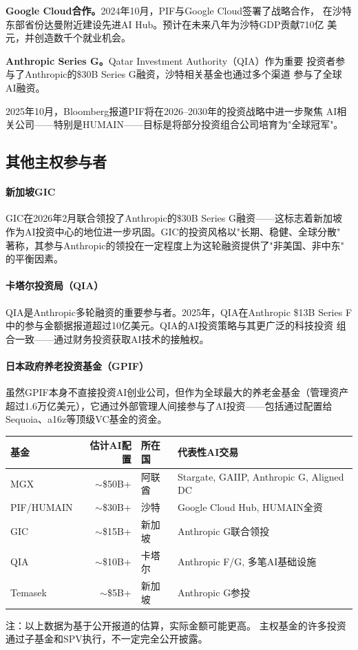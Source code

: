 \textbf{Google Cloud合作。}2024年10月，PIF与Google Cloud签署了战略合作，
在沙特东部省份达曼附近建设先进AI Hub。预计在未来八年为沙特GDP贡献710亿
美元，并创造数千个就业机会。

\textbf{Anthropic Series G。}Qatar Investment Authority（QIA）作为重要
投资者参与了Anthropic的\$30B Series G融资，沙特相关基金也通过多个渠道
参与了全球AI融资。

2025年10月，Bloomberg报道PIF将在2026--2030年的投资战略中进一步聚焦
AI相关公司——特别是HUMAIN——目标是将部分投资组合公司培育为"全球冠军"。


\subsection{其他主权参与者}
\label{subsec:inv-other-sovereign}

\paragraph{新加坡GIC}
GIC在2026年2月联合领投了Anthropic的\$30B Series G融资——这标志着新加坡
作为AI投资中心的地位进一步巩固。GIC的投资风格以"长期、稳健、全球分散"
著称，其参与Anthropic的领投在一定程度上为这轮融资提供了"非美国、非中东"
的平衡因素。

\paragraph{卡塔尔投资局（QIA）}
QIA是Anthropic多轮融资的重要参与者。2025年，QIA在Anthropic \$13B Series F
中的参与金额据报道超过10亿美元。QIA的AI投资策略与其更广泛的科技投资
组合一致——通过财务投资获取AI技术的接触权。

\paragraph{日本政府养老投资基金（GPIF）}
虽然GPIF本身不直接投资AI创业公司，但作为全球最大的养老金基金（管理资产
超过1.6万亿美元），它通过外部管理人间接参与了AI投资——包括通过配置给
Sequoia、a16z等顶级VC基金的资金。

\begin{keybox}[主权财富基金AI投资对比（2024--2026/3）]
\small
\begin{tabularx}{\textwidth}{l r l X}
\toprule
\rowcolor{figLightGray}
\textbf{基金} & \textbf{估计AI配置} & \textbf{所在国}
  & \textbf{代表性AI交易} \\
\midrule
MGX          & $\sim$\$50B+   & 阿联酋
  & Stargate, GAIIP, Anthropic G, Aligned DC \\
PIF/HUMAIN   & $\sim$\$30B+   & 沙特
  & Google Cloud Hub, HUMAIN全资 \\
GIC          & $\sim$\$15B+   & 新加坡
  & Anthropic G联合领投 \\
QIA          & $\sim$\$10B+   & 卡塔尔
  & Anthropic F/G, 多笔AI基础设施 \\
Temasek      & $\sim$\$5B+    & 新加坡
  & Anthropic G参投 \\
\bottomrule
\end{tabularx}

\medskip
\noindent 注：以上数据为基于公开报道的估算，实际金额可能更高。
主权基金的许多投资通过子基金和SPV执行，不一定完全公开披露。
\end{keybox}



